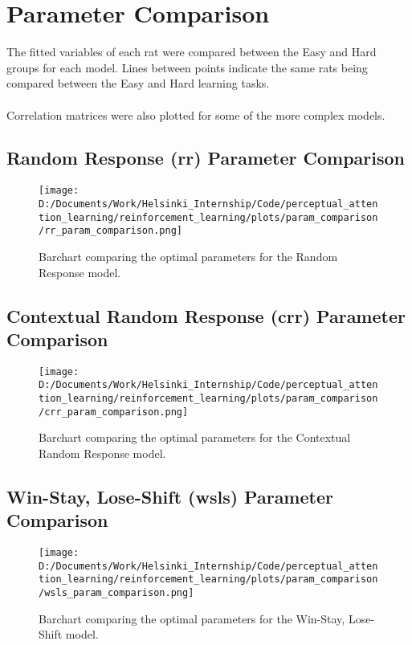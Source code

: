 \documentclass[12pt]{article}
\newcommand{\parameter}{0.35}
\begin{document}
\newpage
\section{Parameter Comparison}
 The fitted variables of each rat were compared between the Easy and Hard groups for each model. Lines between points indicate the same rats being compared between the Easy and Hard learning tasks.
 \\\\
 Correlation matrices were also plotted for some of the more complex models.

\subsection{Random Response (rr) Parameter Comparison}


\begin{figure}[h]  %
	\centering
	\texttt{[image: D:/Documents/Work/Helsinki\_Internship/Code/perceptual\_attention\_learning/reinforcement\_learning/plots/param\_comparison/rr\_param\_comparison.png]}  %
	\caption{Barchart comparing the optimal parameters for the Random Response model.}
	\label{fig:rr_model_parameters}
\end{figure} 
\clearpage
\newpage
\subsection{Contextual Random Response (crr) Parameter Comparison}


\begin{figure}[h]  %
	\centering
	\texttt{[image: D:/Documents/Work/Helsinki\_Internship/Code/perceptual\_attention\_learning/reinforcement\_learning/plots/param\_comparison/crr\_param\_comparison.png]}  %
	\caption{Barchart comparing the optimal parameters for the Contextual Random Response model.}
	\label{fig:crr_model_parameters}
\end{figure} 
\newpage
\clearpage
\subsection{Win-Stay, Lose-Shift (wsls) Parameter Comparison}

\begin{figure}[h]  %
	\centering
	\texttt{[image: D:/Documents/Work/Helsinki\_Internship/Code/perceptual\_attention\_learning/reinforcement\_learning/plots/param\_comparison/wsls\_param\_comparison.png]}  %
	\caption{Barchart comparing the optimal parameters for the Win-Stay, Lose-Shift model.}
	\label{fig:wsls_model_parmeters}
\end{figure} 
\clearpage
\newpage
\end{document}
